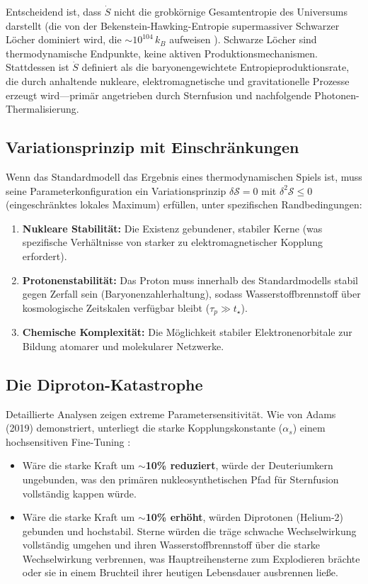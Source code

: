\documentclass[12pt,a4paper]{article}
\theoremstyle{remark}
\begin{document}
Entscheidend ist, dass $\dot{S}$ nicht die grobk\"ornige Gesamtentropie des Universums darstellt (die von der Bekenstein-Hawking-Entropie supermassiver Schwarzer L\"ocher dominiert wird, die $\sim 10^{104}\,k_B$ aufweisen \citep{EntropyMaximum}). Schwarze L\"ocher sind thermodynamische Endpunkte, keine aktiven Produktionsmechanismen. Stattdessen ist $\dot{S}$ definiert als die baryonengewichtete Entropieproduktionsrate, die durch anhaltende nukleare, elektromagnetische und gravitationelle Prozesse erzeugt wird---prim\"ar angetrieben durch Sternfusion und nachfolgende Photonen-Thermalisierung.

\subsection{Variationsprinzip mit Einschr\"ankungen}

Wenn das Standardmodell das Ergebnis eines thermodynamischen Spiels ist, muss seine Parameterkonfiguration ein Variationsprinzip $\delta \mathcal{S} = 0$ mit $\delta^2 \mathcal{S} \leq 0$ (eingeschr\"anktes lokales Maximum) erf\"ullen, unter spezifischen Randbedingungen:
\begin{enumerate}
    \item \textbf{Nukleare Stabilit\"at:} Die Existenz gebundener, stabiler Kerne (was spezifische Verh\"altnisse von starker zu elektromagnetischer Kopplung erfordert).
    \item \textbf{Protonenstabilit\"at:} Das Proton muss innerhalb des Standardmodells stabil gegen Zerfall sein (Baryonenzahlerhaltung), sodass Wasserstoffbrennstoff \"uber kosmologische Zeitskalen verf\"ugbar bleibt ($\tau_p \gg t_\star$).
    \item \textbf{Chemische Komplexit\"at:} Die M\"oglichkeit stabiler Elektronenorbitale zur Bildung atomarer und molekularer Netzwerke.
\end{enumerate}

\subsection{Die Diproton-Katastrophe}

Detaillierte Analysen zeigen extreme Parametersensitivit\"at. Wie von Adams (2019) demonstriert, unterliegt die starke Kopplungskonstante ($\alpha_s$) einem hochsensitiven Fine-Tuning \citep{Adams2019}:

\begin{itemize}
    \item W\"are die starke Kraft um \textbf{$\sim$10\% reduziert}, w\"urde der Deuteriumkern ungebunden, was den prim\"aren nukleosynthetischen Pfad f\"ur Sternfusion vollst\"andig kappen w\"urde.
    \item W\"are die starke Kraft um \textbf{$\sim$10\% erh\"oht}, w\"urden Diprotonen (Helium-2) gebunden und hochstabil. Sterne w\"urden die tr\"age schwache Wechselwirkung vollst\"andig umgehen und ihren Wasserstoffbrennstoff \"uber die starke Wechselwirkung verbrennen, was Hauptreihensterne zum Explodieren br\"achte oder sie in einem Bruchteil ihrer heutigen Lebensdauer ausbrennen lie\ss{}e.
\end{itemize}
\end{document}
